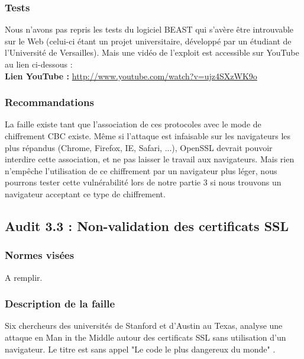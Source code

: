 \subsubsection{Tests}

Nous n'avons pas repris les tests du logiciel BEAST qui s'avère être introuvable sur le Web (celui-ci étant un projet universitaire, développé par un étudiant de l'Université de Versailles). Mais une vidéo de l'exploit est accessible sur YouTube au lien ci-dessous : \\

\textbf{Lien YouTube : } \href{http://www.youtube.com/watch?v=ujz4SXzWK9o} {http://www.youtube.com/watch?v=ujz4SXzWK9o}

\subsubsection{Recommandations}

La faille existe tant que l'association de ces protocoles avec le mode de chiffrement CBC existe. Même si l'attaque est infaisable sur les navigateurs les plus répandus (Chrome, Firefox, IE, Safari, ...), OpenSSL devrait pouvoir interdire cette association, et ne pas laisser le travail aux navigateurs. Mais rien n'empêche l'utilisation de ce chiffrement par un navigateur plus léger, nous pourrons tester cette vulnérabilité lors de notre partie 3 si nous trouvons un navigateur acceptant ce type de chiffrement.

\subsection{Audit 3.3 : Non-validation des certificats SSL}
\subsubsection{Normes visées}

A remplir.

\subsubsection{Description de la faille}

Six chercheurs des universités de Stanford et d'Austin au Texas, analyse une attaque en Man in the Middle autour des certificats SSL sans utilisation d'un navigateur. Le titre est sans appel "Le code le plus dangereux du monde" \cite{validate2012martin}.\\


